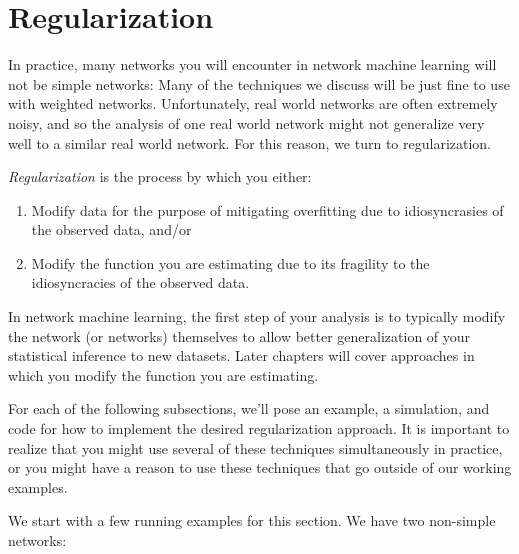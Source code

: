 \section{Regularization}
\label{sec:ch4:regularization}

In practice, many networks you will encounter in network machine learning will not be simple networks: Many of the techniques we discuss will be just fine to use with weighted networks. Unfortunately, real world networks are often extremely noisy, and so the analysis of one real world network might not generalize very well to a similar real world network. For this reason, we turn to regularization. 

\textit{Regularization} is the process by which you either:
\begin{enumerate}
    \item Modify data for the purpose of mitigating overfitting due to idiosyncrasies of the observed data, and/or
    \item Modify the function you are estimating due to its fragility to the idiosyncracies of the observed data.
\end{enumerate}

In network machine learning, the first step of your analysis is to typically modify the network (or networks) themselves to allow better generalization of your statistical inference to new datasets. Later chapters will cover approaches in which you modify the function you are estimating.

For each of the following subsections, we'll pose an example, a simulation, and code for how to implement the desired regularization approach. It is important to realize that you might use several of these techniques simultaneously in practice, or you might have a reason to use these techniques that go outside of our working examples.

We start with a few running examples for this section. We have two non-simple networks:

